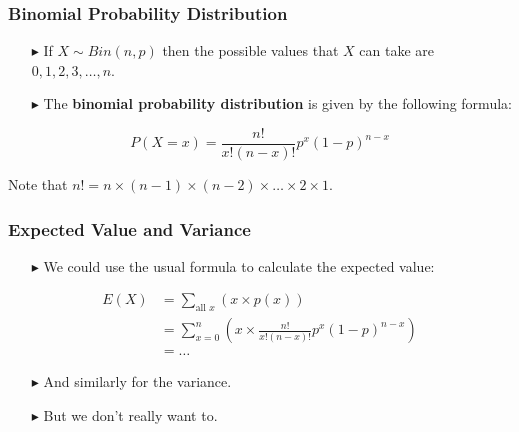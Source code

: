 \documentclass[12pt]{beamer}
\begin{document}
\begin{frame}
	\frametitle{Binomial Probability Distribution}
	
	\begin{itemize}
		\item[\color{blue}$\blacktriangleright$]If $X \sim Bin(n, p)$ then the possible values that $X$ can take are $0, 1, 2, 3, \ldots, n$.
		
		\item[\color{blue}$\blacktriangleright$]The \textbf{binomial probability distribution} is given by the following formula:
	\end{itemize}
	
	\vspace{0.5cm}
	
	\[
	P(X = x) = \frac{n!}{x!(n - x)!}p^x(1 - p)^{n-x}
	\]
	
	\vspace{0.5cm}
	
	Note that $n! = n \times (n - 1) \times (n - 2) \times \ldots \times 2 \times 1$.
	
\end{frame}
\begin{frame}
	\frametitle{Expected Value and Variance}
	
	\begin{itemize}
		\item[\color{blue}$\blacktriangleright$]We could use the usual formula to calculate the expected value:
	\end{itemize}
	
	\vspace{0.5cm}
	
	\begin{align*}
		E(X) &= \sum_{\text{all }x} (x \times p(x)) \\[0.5em]
		&= \sum_{x=0}^n \left(x \times \frac{n!}{x!(n-x)!}p^x(1-p)^{n-x}\right) \\[0.5em]
		&= \ldots
	\end{align*}
	
	\vspace{0.5cm}
	
	\begin{itemize}
		\item[\color{blue}$\blacktriangleright$]And similarly for the variance.
		\item[\color{blue}$\blacktriangleright$]But we don't really want to.
	\end{itemize}
	
\end{frame}
\end{document}

